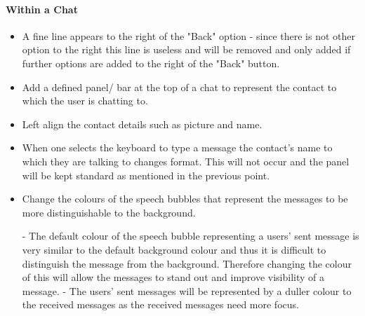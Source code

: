 \documentclass[11pt]{article}
\begin{document}
\paragraph{Within a Chat}
\begin{itemize}
\item A	fine line appears to the right of the "Back" option - since there is not other option to the right this line is useless and will be removed and only added if further options are added to the right of the "Back" button.

\item	Add a defined panel/ bar at the top of a chat to represent the contact to which the user is chatting to. 

\item	Left align the contact details such as picture and name.

\item When one selects the keyboard to type a message the contact's name to which they are talking to changes format. This will not occur and the panel will be kept standard as mentioned in the previous point.

\item	Change the colours of the speech bubbles that represent the messages to be more distinguishable to the background.

\subitem	- The default colour of the speech bubble representing a users' sent message is very similar to the default background colour and thus it is difficult to distinguish the message from the background. Therefore changing the colour of this will allow the messages to stand out and improve visibility of a message.
\subitem 	- The users' sent messages will be represented by a duller colour to the received messages as the received messages need more focus.


\end{itemize}
\end{document}
